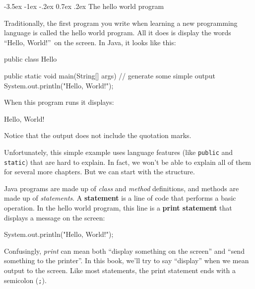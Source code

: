 \documentclass[12pt]{book}
\makeatletter
\theoremstyle{exercise}
\newcommand{\java}[1]{\verb"#1"}
\renewcommand{\section}{\@startsection{section}{1}{\z@}%
    {-3.5ex \@plus -1ex \@minus -.2ex}%
    {0.7ex \@plus.2ex}%
    {\normalfont\Large\bfseries}}
\newcommand{\java}[1]{\lstinline{#1}} %
\makeatother
\begin{document}
\section{The hello world program}
\label{hello}


Traditionally, the first program you write when learning a new programming language is called the hello world program.
All it does is display the words ``Hello, World!''\ on the screen.
In Java, it looks like this:

\begin{code}
public class Hello {

    public static void main(String[] args) {
        // generate some simple output
        System.out.println("Hello, World!");
    }
}
\end{code}

When this program runs it displays:

\begin{stdout}
Hello, World!
\end{stdout}

Notice that the output does not include the quotation marks.


Unfortunately, this simple example uses language features (like \java{public} and \java{static}) that are hard to explain.
In fact, we won't be able to explain all of them for several more chapters.
But we can start with the structure.


Java programs are made up of {\em class} and {\em method} definitions, and methods are made up of {\em statements}.
A {\bf statement} is a line of code that performs a basic operation.
In the hello world program, this line is a {\bf print statement} that displays a message on the screen:

\begin{code}
    System.out.println("Hello, World!");
\end{code}


Confusingly, {\em print} can mean both ``display something on the screen'' and ``send something to the printer''.
In this book, we'll try to say ``display'' when we mean output to the screen.
Like most statements, the print statement ends with a semicolon (\java{;}).
\end{document}

